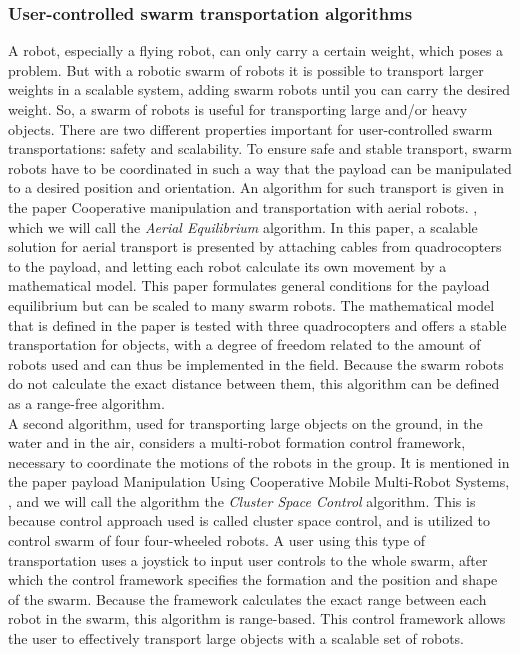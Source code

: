 \subsubsection{User-controlled swarm transportation algorithms}
A robot, especially a flying robot, can only carry a certain weight, which poses a problem. 
But with a robotic swarm of robots it is possible to transport larger weights in a scalable system, adding swarm robots until you can carry the desired weight. 
So, a swarm of robots is useful for transporting large and/or heavy objects. 
There are two different properties important for user-controlled swarm transportations: safety and scalability. 
To ensure safe and stable transport, swarm robots have to be coordinated in such a way that the payload can be manipulated to a desired position and orientation.
An algorithm for such transport is given in the paper Cooperative manipulation and transportation with aerial robots. \cite{Michael2011cooperative}, which we will call the \emph{Aerial Equilibrium} algorithm. 
In this paper, a scalable solution for aerial transport is presented by attaching cables from quadrocopters to the payload, and letting each robot calculate its own movement by a mathematical model. 
This paper formulates general conditions for the payload equilibrium but can be scaled to many swarm robots. 
The mathematical model that is defined in the paper is tested with three quadrocopters and offers a stable transportation for objects, with a degree of freedom related to the amount of robots used and can thus be implemented in the field.
Because the swarm robots do not calculate the exact distance between them, this algorithm can be defined as a range-free algorithm. \\

A second algorithm, used for transporting large objects on the ground, in the water and in the air, considers a multi-robot formation control framework, necessary to coordinate the motions of the robots in the group. 
It is mentioned in the paper payload Manipulation Using Cooperative Mobile Multi-Robot Systems, \cite{Mas2012object}, and we will call the algorithm the \emph{Cluster Space Control} algorithm.
This is because control approach used is called cluster space control, and is utilized to control swarm of four four-wheeled robots. 
A user using this type of transportation uses a joystick to input user controls to the whole swarm, after which the control framework specifies the formation and the position and shape of the swarm.
Because the framework calculates the exact range between each robot in the swarm, this algorithm is range-based. 
This control framework allows the user to effectively transport large objects with a scalable set of robots. \\

